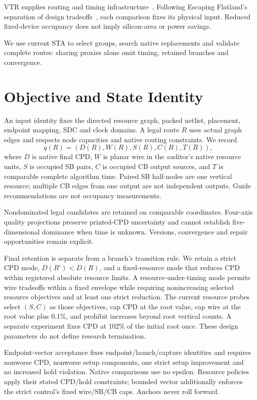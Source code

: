 \documentclass[conference,10pt]{IEEEtran}
\begin{document}
VTR supplies routing and timing infrastructure~\cite{vtr9paper}. Following Escaping Flatland's separation of design tradeoffs~\cite{flatland}, each comparison fixes its physical input. Reduced fixed-device occupancy does not imply silicon-area or power savings.

We use current STA to select groups, search native replacements and validate complete routes: sharing proxies alone omit timing, retained branches and convergence. 

\section{Objective and State Identity}
An input identity fixes the directed resource graph, packed netlist, placement, endpoint mapping, SDC and clock domains. A legal route $R$ uses actual graph edges and respects node capacities and native routing constraints. We record
\begin{equation}
 q(R)=(D(R),W(R),S(R),C(R),T(R)),
\end{equation}
where $D$ is native final CPD, $W$ is planar wire in the auditor's native resource units, $S$ is occupied SB pairs, $C$ is occupied CB output sources, and $T$ is comparable complete algorithm time. Paired SB half-nodes are one vertical resource; multiple CB edges from one output are not independent outputs. Guide recommendations are not occupancy measurements.

Nondominated legal candidates are retained on comparable coordinates. Four-axis quality projections preserve printed-CPD uncertainty and cannot establish five-dimensional dominance when time is unknown. Versions, convergence and repair opportunities remain explicit.

Final retention is separate from a branch's transition rule. We retain a strict CPD mode, $D(R')<D(R)$, and a fixed-resource mode that reduces CPD within registered absolute resource limits. A resource-under-timing mode permits wire tradeoffs within a fixed envelope while requiring nonincreasing selected resource objectives and at least one strict reduction. The current resource probes select $(S,C)$ as those objectives, cap CPD at the root value, cap wire at the root value plus 0.1\%, and prohibit increases beyond root vertical counts. A separate experiment fixes CPD at 102\% of the initial root once. These design parameters do not define research termination.

Endpoint-vector acceptance fixes endpoint/launch/capture identities and requires nonworse CPD, nonworse setup components, one strict setup improvement and no increased hold violation. Native comparisons use no epsilon. Resource policies apply their stated CPD/hold constraints; bounded vector additionally enforces the strict control's fixed wire/SB/CB caps. Anchors never roll forward.
\end{document}
